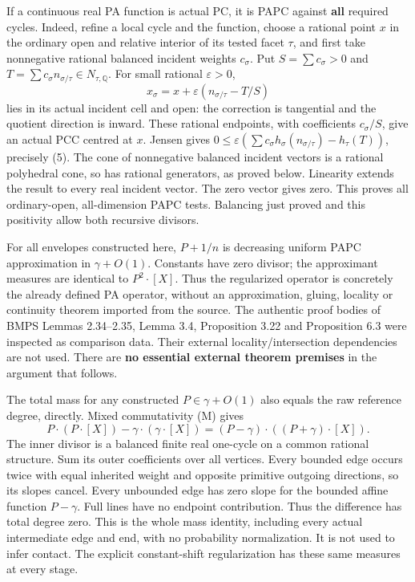 \documentclass[
  11pt,
]{article}
\begin{document}
If a continuous real PA function is actual PC, it is PAPC against
\textbf{all} required cycles. Indeed, refine a local cycle and the
function, choose a rational point \(x\) in the ordinary open and
relative interior of its tested facet \(\tau\), and first take
nonnegative rational balanced incident weights \(c_\sigma\). Put
\(S=\sum c_\sigma>0\) and
\(T=\sum c_\sigma n_{\sigma/\tau}\in N_{\tau,\mathbb{Q}}\). For small
rational \(\varepsilon>0\), \[
 x_\sigma=x+\varepsilon(n_{\sigma/\tau}-T/S)
\] lies in its actual incident cell and open: the correction is
tangential and the quotient direction is inward. These rational
endpoints, with coefficients \(c_\sigma/S\), give an actual PCC centred
at \(x\). Jensen gives
\(0\leq\varepsilon(\sum c_\sigma h_\sigma(n_{\sigma/\tau})-h_\tau(T))\),
precisely (5). The cone of nonnegative balanced incident vectors is a
rational polyhedral cone, so has rational generators, as proved below.
Linearity extends the result to every real incident vector. The zero
vector gives zero. This proves all ordinary-open, all-dimension PAPC
tests. Balancing just proved and this positivity allow both recursive
divisors.

For all envelopes constructed here, \(P+1/n\) is decreasing uniform PAPC
approximation in \(\gamma+O(1)\). Constants have zero divisor; the
approximant measures are identical to \(P^2\cdot[X]\). Thus the
regularized operator is concretely the already defined PA operator,
without an approximation, gluing, locality or continuity theorem
imported from the source. The authentic proof bodies of BMPS Lemmas
2.34--2.35, Lemma 3.4, Proposition 3.22 and Proposition 6.3 were
inspected as comparison data. Their external locality/intersection
dependencies are not used. There are \textbf{no essential external
theorem premises} in the argument that follows.

The total mass for any constructed \(P\in\gamma+O(1)\) also equals the
raw reference degree, directly. Mixed commutativity (M) gives \[
 P\cdot(P\cdot[X])-\gamma\cdot(\gamma\cdot[X])
      =(P-\gamma)\cdot((P+\gamma)\cdot[X]).                 \tag{Deg}
\] The inner divisor is a balanced finite real one-cycle on a common
rational structure. Sum its outer coefficients over all vertices. Every
bounded edge occurs twice with equal inherited weight and opposite
primitive outgoing directions, so its slopes cancel. Every unbounded
edge has zero slope for the bounded affine function \(P-\gamma\). Full
lines have no endpoint contribution. Thus the difference has total
degree zero. This is the whole mass identity, including every actual
intermediate edge and end, with no probability normalization. It is not
used to infer contact. The explicit constant-shift regularization has
these same measures at every stage.
\end{document}
